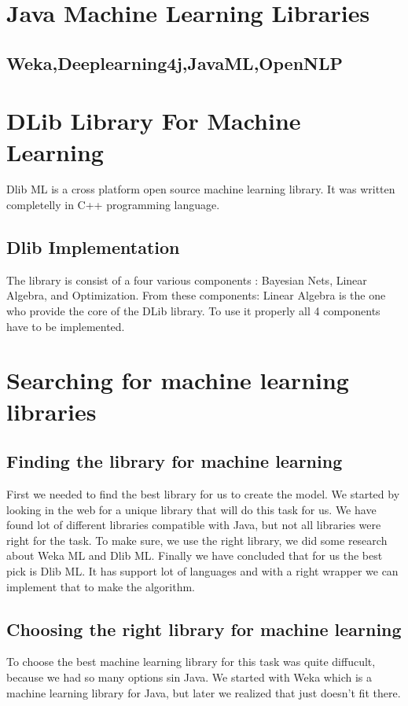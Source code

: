 \documentclass[english,12pt,oneside,a4paper]{article}
\begin{document}
\begin{center}
		\section{Java Machine Learning Libraries}
		
		\subsection{Weka,Deeplearning4j,JavaML,OpenNLP}
		
		\section{DLib Library For Machine Learning}
		Dlib ML is a cross platform open source machine learning library. It was written completelly in C++ programming language.
		\subsection{Dlib Implementation}
		The library is consist of a four various components : Bayesian Nets, Linear Algebra, and Optimization. From these components: Linear Algebra is the one who provide the core of the DLib library. To use it properly all 4 components have to be implemented.
		\section{Searching for machine learning libraries}
	
		\subsection{Finding the library for machine learning}
		First we needed to find the best library for us to create the model.
		We started by looking in the web for a unique library that will do this task for us. We have found lot of different libraries compatible with Java, but not all libraries were right for the task. To make sure, we use the right library, we did some research about Weka ML and Dlib ML.
		Finally we have concluded that for us the best pick is Dlib ML. It has support lot of languages and with a right wrapper we can implement that to make the algorithm.
		\subsection{Choosing the right library for machine learning}
		To choose the best machine learning library for this task was quite diffucult, because we had so many options sin Java. We started with Weka which is a machine learning library for Java, but later we realized that just doesn't fit there.

\end{center}
\end{document}

